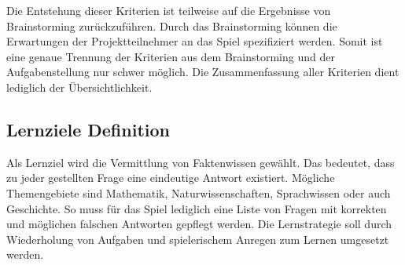 	Die Entstehung dieser Kriterien ist teilweise auf die Ergebnisse von Brainstorming zurückzuführen. Durch das Brainstorming können die Erwartungen der Projektteilnehmer an das Spiel spezifiziert werden. Somit ist eine genaue Trennung der Kriterien aus dem Brainstorming und der Aufgabenstellung nur schwer möglich. Die Zusammenfassung aller Kriterien dient lediglich der Übersichtlichkeit.

\subsection{Lernziele Definition}\label{ssec:lern-def}
	Als Lernziel wird die Vermittlung von Faktenwissen gewählt. Das bedeutet, dass zu jeder gestellten Frage eine eindeutige Antwort existiert. Mögliche Themengebiete sind Mathematik, Naturwissenschaften, Sprachwissen oder auch Geschichte. So muss für das Spiel lediglich eine Liste von Fragen mit korrekten und möglichen falschen Antworten gepflegt werden.
	Die Lernstrategie soll durch Wiederholung von Aufgaben und spielerischem Anregen zum Lernen umgesetzt werden.

